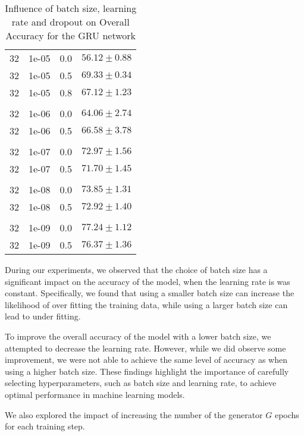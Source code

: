 \begin{table}[H]
\begin{tabular}{cccr}
      32  &   1e-05 & 0.0 & $56.12 \pm 0.88$\\
      32  &   1e-05 & 0.5 & $69.33 \pm 0.34$\\
      32  &   1e-05 & 0.8 & $67.12 \pm 1.23$\\[0.05cm] \hline \\[-0.25cm]

      32  &   1e-06 & 0.0 & $64.06 \pm 2.74$\\
      32  &   1e-06 & 0.5 & $66.58 \pm 3.78$\\[0.05cm] \hline \\[-0.25cm]

      32  &   1e-07 & 0.0 & $72.97 \pm 1.56$\\
      32  &   1e-07 & 0.5 & $71.70 \pm 1.45$\\[0.05cm] \hline \\[-0.25cm]

      32  &   1e-08 & 0.0 & $73.85 \pm 1.31$\\
      32  &   1e-08 & 0.5 & $72.92 \pm 1.40$\\[0.05cm] \hline \\[-0.25cm]

      32  &   1e-09 & 0.0 & $\mathbf{77.24 \pm 1.12}$\\
      32  &   1e-09 & 0.5 & $76.37 \pm 1.36$\\
  \end{tabular}
  \caption{Influence of batch size, learning rate and dropout on Overall Accuracy for the GRU network}
  \label{tab:AJRNNbatchsize}
\end{table}

During our experiments, we observed that the choice of batch size has a significant impact on the accuracy of the model, when the learning rate is was constant.
Specifically, we found that using a smaller batch size can increase the likelihood of over fitting the training data, while using a larger batch size can lead to under fitting.

To improve the overall accuracy of the model with a lower batch size, we attempted to decrease the learning rate.
However, while we did observe some improvement, we were not able to achieve the same level of accuracy as when using a higher batch size.
These findings highlight the importance of carefully selecting hyperparameters, such as batch size and learning rate, to achieve optimal performance in machine learning models.

We also explored the impact of increasing the number of the generator $G$ epochs for each training step.

